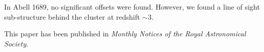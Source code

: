 In Abell 1689, no significant offsets were found. However,  
we found a line of sight sub-structure behind the cluster at
redshift $\sim 3$. 

This paper has been published in {\it Monthly Notices of the Royal Astronomical
Society}. 



\clearpage
